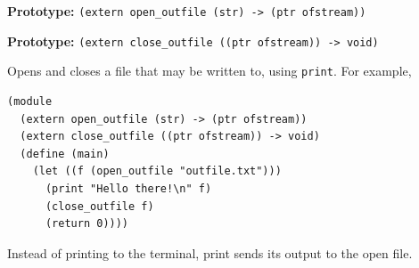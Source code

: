 \documentclass[oneside]{report}
\begin{document}
\textbf{Prototype:} \lstinline{(extern open_outfile (str) -> (ptr ofstream))}

\textbf{Prototype:} \lstinline{(extern close_outfile ((ptr ofstream)) -> void)}

Opens and closes a file that may be written to, using
\lstinline{print}.  For example,

\begin{lstlisting}
(module
  (extern open_outfile (str) -> (ptr ofstream))
  (extern close_outfile ((ptr ofstream)) -> void)
  (define (main)
    (let ((f (open_outfile "outfile.txt")))
      (print "Hello there!\n" f)
      (close_outfile f)
      (return 0))))
\end{lstlisting}

Instead of printing to the terminal, print sends its output to the open file.
\end{document}

